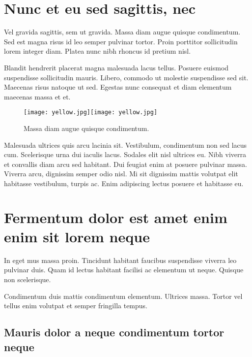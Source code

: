 \documentclass[
]{HyperedReport}
\begin{document}
\section*{Nunc et eu sed sagittis, nec}

Vel gravida sagittis, sem ut gravida. Massa diam augue quisque condimentum. Sed est magna risus id leo semper pulvinar tortor. Proin porttitor sollicitudin lorem integer diam. Platea nunc nibh rhoncus id pretium nisl.

Blandit hendrerit placerat magna malesuada lacus tellus. Posuere euismod suspendisse sollicitudin mauris. Libero, commodo ut molestie suspendisse sed sit. Maecenas risus natoque ut sed. Egestas nunc consequat et diam elementum maecenas massa et et.

\begin{figure*}[H] %
	\texttt{[image: yellow.jpg]}\hfill\texttt{[image: yellow.jpg]}
	\caption{Massa diam augue quisque condimentum.}
\end{figure*}

Malesuada ultrices quis arcu lacinia sit. Vestibulum, condimentum non sed lacus cum. Scelerisque urna dui iaculis lacus. Sodales elit nisl ultrices eu. Nibh viverra et convallis diam arcu sed habitant. Dui feugiat enim at posuere pulvinar massa. Viverra arcu, dignissim semper odio nisl. Mi sit dignissim mattis volutpat elit habitasse vestibulum, turpis ac. Enim adipiscing lectus posuere et habitasse eu.


\newpage

\section*{Fermentum dolor est amet enim enim sit lorem neque}

In eget mus massa proin. Tincidunt habitant faucibus suspendisse viverra leo pulvinar duis. Quam id lectus habitant facilisi ac elementum ut neque. Quisque non scelerisque.

Condimentum duis mattis condimentum elementum. Ultrices massa. Tortor vel tellus enim volutpat et semper fringilla tempus.

\subsection*{Mauris dolor a neque condimentum tortor neque}
\end{document}
